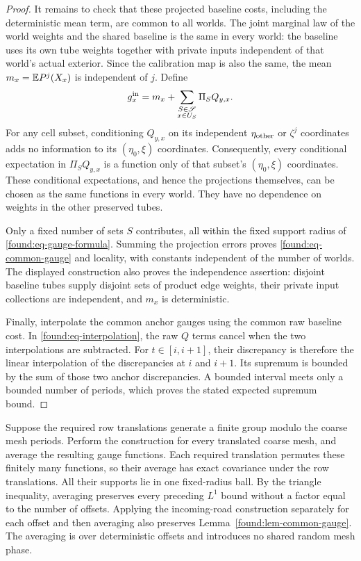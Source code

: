 \begin{proof}
It remains to check that these projected baseline costs, including
the deterministic mean term, are common to all worlds.  The joint
marginal law of the world weights and the shared baseline is the same
in every world: the baseline uses its own tube weights together with
private inputs independent of that world's actual exterior.  Since
the calibration map is also the same, the mean
$m_x=\mathbb E P^j(X_x)$ is independent of $j$.  Define
\[
 g_x^{\rm in}=m_x+
       \sum_{\substack{S\in\mathscr S\\x\in U_S}}
                        \Pi_SQ_{y,x}.
\]
For any cell subset, conditioning $Q_{y,x}$ on its independent
$\eta_{\rm other}$ or $\zeta^j$ coordinates adds no information to
its $(\eta_0,\xi)$ coordinates.  Consequently, every conditional
expectation in $\Pi_SQ_{y,x}$ is a function only of that subset's
$(\eta_0,\xi)$ coordinates.  These conditional expectations, and
hence the projections themselves, can be chosen as the same
functions in every world.  They have no dependence on weights in
the other preserved tubes.

Only a fixed number of sets $S$ contributes, all within the fixed
support radius of \eqref{found:eq-gauge-formula}.  Summing the
projection errors proves \eqref{found:eq-common-gauge} and locality,
with constants independent of the number of worlds.  The displayed
construction also proves the independence assertion: disjoint
baseline tubes supply disjoint sets of product edge weights, their
private input collections are independent, and $m_x$ is deterministic.

Finally, interpolate the common anchor gauges using the common raw
baseline cost.  In \eqref{found:eq-interpolation}, the raw $Q$ terms
cancel when the two interpolations are subtracted.  For
$t\in[i,i+1]$, their discrepancy is therefore the linear
interpolation of the discrepancies at $i$ and $i+1$.  Its supremum
is bounded by the sum of those two anchor discrepancies.  A bounded
interval meets only a bounded number of periods, which proves the
stated expected supremum bound.
\end{proof}

\begin{remark}
\label{found:rem-offsets}
Suppose the required row translations generate a finite group modulo
the coarse mesh periods.  Perform the construction for every
translated coarse mesh, and average the resulting gauge functions.
Each required translation permutes these finitely many functions,
so their average has exact covariance under the row translations.
All their supports lie in one fixed-radius ball.  By the triangle
inequality, averaging preserves every preceding $L^1$ bound without
a factor equal to the number of offsets.  Applying the incoming-road
construction separately for each offset and then averaging also
preserves Lemma~\ref{found:lem-common-gauge}.  The averaging is over
deterministic offsets and introduces no shared random mesh phase.
\end{remark}
